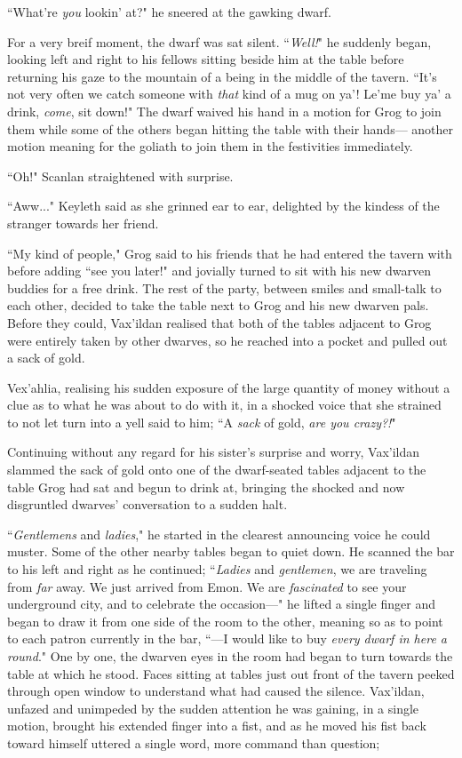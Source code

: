 ``What're \textit{you} lookin' at?" he sneered at the gawking dwarf.

For a very breif moment, the dwarf was sat silent. ``\textit{Well!}" he suddenly began, looking left and right to his fellows sitting beside him at the table before returning his gaze to the mountain of a being in the middle of the tavern. ``It's not very often we catch someone with \textit{that} kind of a mug on ya'! Le'me buy ya' a drink, \textit{come}, sit down!" The dwarf waived his hand in a motion for Grog to join them while some of the others began hitting the table with their hands--- another motion meaning for the goliath to join them in the festivities immediately.

``Oh!" Scanlan straightened with surprise.

``Aww..." Keyleth said as she grinned ear to ear, delighted by the kindess of the stranger towards her friend.

``My kind of people," Grog said to his friends that he had entered the tavern with before adding ``see you later!" and jovially turned to sit with his new dwarven buddies for a free drink. The rest of the party, between smiles and small-talk to each other, decided to take the table next to Grog and his new dwarven pals. Before they could, Vax'ildan realised that both of the tables adjacent to Grog were entirely taken by other dwarves, so he reached into a pocket and pulled out a sack of gold. 

Vex'ahlia, realising his sudden exposure of the large quantity of money without a clue as to what he was about to do with it, in a shocked voice that she strained to not let turn into a yell said to him; ``A \textit{sack} of gold, \textit{are you crazy?!}"

Continuing without any regard for his sister's surprise and worry, Vax'ildan slammed the sack of gold onto one of the dwarf-seated tables adjacent to the table Grog had sat and begun to drink at, bringing the shocked and now disgruntled dwarves' conversation to a sudden halt.

``\textit{Gentlemens} and \textit{ladies}," he started in the clearest announcing voice he could muster. Some of the other nearby tables began to quiet down. He scanned the bar to his left and right as he continued; ``\textit{Ladies} and \textit{gentlemen}, we are traveling from \textit{far} away. We just arrived from Emon. We are \textit{fascinated} to see your underground city, and to celebrate the occasion---" he lifted a single finger and began to draw it from one side of the room to the other, meaning so as to point to each patron currently in the bar, ``---I would like to buy \textit{every dwarf in here a round}." One by one, the dwarven eyes in the room had began to turn towards the table at which he stood. Faces sitting at tables just out front of the tavern peeked through open window to understand what had caused the silence. Vax'ildan, unfazed and unimpeded by the sudden attention he was gaining, in a single motion, brought his extended finger into a fist, and as he moved his fist back toward himself uttered a single word, more command than question; 

